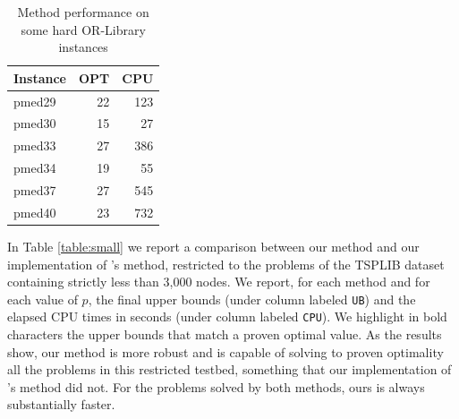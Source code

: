 \documentclass[ijoo,nonblindrev]{informs-ijoo}
\begin{document}
\begin{table}[!hbtp]
	\centering
	\begin{tabular}{|l|rr|}
		\hline
		Instance & OPT & CPU\\
		\hline
		pmed29	& 22	& 123\\
		pmed30	& 15	& 27\\
		pmed33	& 27	& 386\\
		pmed34	& 19	& 55\\
		pmed37	& 27	& 545\\
		pmed40	& 23	& 732\\
		\hline
	\end{tabular}
\caption{Method performance on some hard OR-Library instances\label{table:orlib}}
\end{table}

In Table \ref{table:small} we report a comparison between our method and our implementation of \citeauthor{Sayah2017new}'s method, restricted to the problems of the TSPLIB dataset containing strictly less than 3,000 nodes. We report, for each method and for each value of $p$, the final upper bounds (under column labeled \texttt{UB}) and the elapsed CPU times in seconds (under column labeled \texttt{CPU}). We highlight in bold characters the upper bounds that match a proven optimal value. As the results show, our method is more robust and is capable of solving to proven optimality all the problems in this restricted testbed, something that our implementation of \citeauthor{Sayah2017new}'s method did not. For the problems solved by both methods, ours is always substantially faster.
\end{document}
